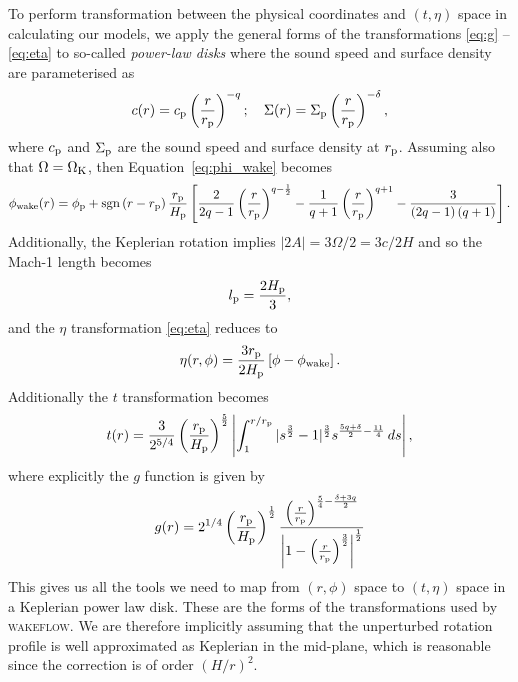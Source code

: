 To perform transformation between the physical coordinates and $(t,\eta)$ space in calculating our models, we apply the general forms of the transformations \eqref{eq:g} -- \eqref{eq:eta} to so-called \textit{power-law disks} where the sound speed and surface density are parameterised as
\begin{align}
    c(r) = c_{\rm p} \left(\frac{r}{r_{\rm p}}\right)^{-q}; \quad \Sigma(r) = \Sigma_{\rm p} \left(\frac{r}{r_{\rm p}}\right)^{-\delta},
\end{align}
where $c_{\rm p}$ and $\Sigma_{\rm p}$ are the sound speed and surface density at $r_{\rm p}$.
Assuming also that $\Omega=\Omega_{\rm K}$, then Equation~\eqref{eq:phi_wake} becomes \citep{rafikov2002a}
\begin{align}
    \phi_{\rm wake}(r) = \phi_{\rm p} + {\rm sgn} \left( r - r_{\rm p} \right) \frac{r_{\rm p}}{H_{\rm p}} \left[ \frac{2}{2q-1} \left(\frac{r}{r_{\rm p}}\right)^{q-\frac{1}{2}} - \frac{1}{q+1} \left(\frac{r}{r_{\rm p}}\right)^{q+1} - \frac{3}{\left(2q-1\right)\left(q+1\right)} \right]. \label{eq:power_law_wake}
\end{align}
Additionally, the Keplerian rotation implies $|2A| = 3\Omega/2 = 3c/2H$ and so the Mach-1 length becomes
\begin{align}
    l_{\rm p} = \frac{2H_{\rm p}}{3},
\end{align}
and the $\eta$ transformation \eqref{eq:eta} reduces to 
\begin{align}
    \eta(r, \phi) = \frac{3 r_{\rm p}}{2 H_{\rm p}} \left[ \phi - \phi_{\rm wake} \right].
\end{align}
Additionally the $t$ transformation becomes \citep{rafikov2002a}
\begin{align}
    t(r) = \frac{3}{2^{5/4}} \left( \frac{r_{\rm p}}{H_{\rm p}} \right)^{\frac{5}{2}} \left| \int_1^{r/r_{\rm p}} |s^\frac{3}{2} - 1|^\frac{3}{2} s^{\frac{5q+\delta}{2}-\frac{11}{4}}\, ds \right|, \label{eq:t_power}
\end{align}
where explicitly the $g$ function is given by \citep{bollati2021}
\begin{align}
    g(r) = 2^{1/4} \left( \frac{r_{\rm p}}{H_{\rm p}} \right)^{\frac{1}{2}} \frac{\left( \frac{r}{r_{\rm p}} \right)^{\frac{5}{4} - \frac{\delta + 3q}{2}}}{\left| 1 - \left(\frac{r}{r_{\rm p}}\right)^\frac{3}{2} \right|^\frac{1}{2}} \label{eq:g_power}
\end{align}
This gives us all the tools we need to map from $(r,\phi)$ space to $(t,\eta)$ space in a Keplerian power law disk.
These are the forms of the transformations used by \textsc{wakeflow}.
We are therefore implicitly assuming that the unperturbed rotation profile is well approximated as Keplerian in the mid-plane, which is reasonable since the correction is of order $\left(H/r\right)^2$.

